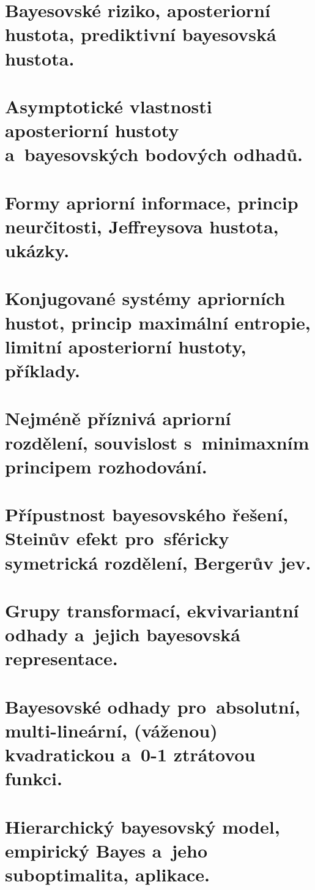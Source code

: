 \chapter{Bayesovské riziko, aposteriorní hustota, prediktivní bayesovská hustota.}


\chapter{Asymptotické vlastnosti aposteriorní hustoty a~bayesovských bodových odhadů.}


\chapter{Formy apriorní informace, princip neurčitosti, Jeffreysova hustota, ukázky.}


\chapter{Konjugované systémy apriorních hustot, princip maximální entropie, limitní aposteriorní hustoty, příklady.}


\chapter{Nejméně příznivá apriorní rozdělení, souvislost s~minimaxním principem rozhodování.}


\chapter{Přípustnost bayesovského řešení, Steinův efekt pro~sféricky symetrická rozdělení, Bergerův jev.}


\chapter{Grupy transformací, ekvivariantní odhady a~jejich bayesovská representace.}


\chapter{Bayesovské odhady pro~absolutní, multi-lineární, (váženou) kvadratickou a~0-1 ztrátovou funkci.}


\chapter{Hierarchický bayesovský model, empirický Bayes a~jeho suboptimalita, aplikace.}


